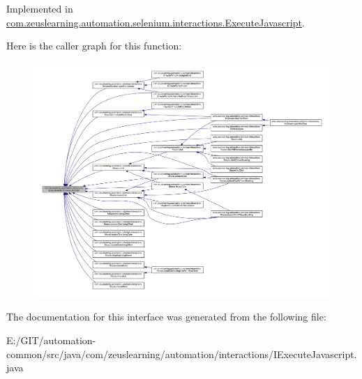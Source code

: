 Implemented in \hyperlink{classcom_1_1zeuslearning_1_1automation_1_1selenium_1_1interactions_1_1ExecuteJavascript_adc7cfbadf6cfb984c5487e8bcab549d9}{com.\+zeuslearning.\+automation.\+selenium.\+interactions.\+Execute\+Javascript}.

Here is the caller graph for this function\+:
\nopagebreak
\begin{figure}[H]
\begin{center}
\leavevmode
\includegraphics[width=350pt]{de/d14/interfacecom_1_1zeuslearning_1_1automation_1_1interactions_1_1IExecuteJavascript_a2460e236de6afd1c685b77700474b901_icgraph}
\end{center}
\end{figure}


The documentation for this interface was generated from the following file\+:\begin{DoxyCompactItemize}
\item 
E\+:/\+G\+I\+T/automation-\/common/src/java/com/zeuslearning/automation/interactions/I\+Execute\+Javascript.\+java\end{DoxyCompactItemize}
